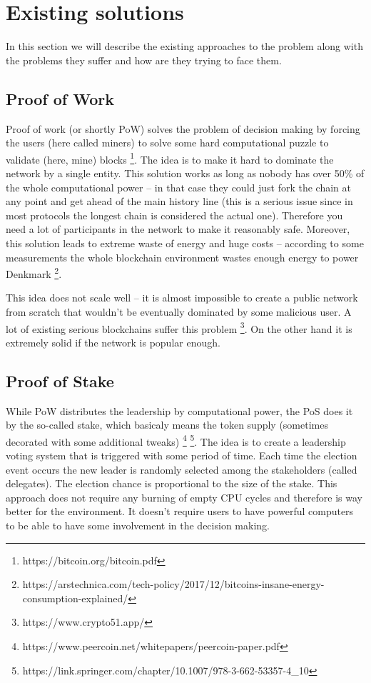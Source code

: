 
\section{Existing solutions}

In this section we will describe the existing approaches to the problem along
with the problems they suffer and how are they trying to face them.

\subsection{Proof of Work}

Proof of work (or shortly PoW) solves the problem of decision making by forcing the
users (here called miners) to solve some hard computational puzzle to validate
(here, mine) blocks \footnote{https://bitcoin.org/bitcoin.pdf}.
The idea is to make it hard to dominate the network by a
single entity. This solution works as long as nobody has over 50\% of the whole
computational power – in that case they could just fork the chain at any point
and get ahead of the main history line (this is a serious issue since in most
protocols the longest chain is considered the actual one). Therefore you need a
lot of participants in the network to make it reasonably safe. Moreover, this
solution leads to extreme waste of energy and huge costs – according to some
measurements the whole blockchain environment wastes enough energy to power
Denkmark
\footnote{https://arstechnica.com/tech-policy/2017/12/bitcoins-insane-energy-consumption-explained/}.

This idea does not scale well – it is almost impossible to create a public
network from scratch that wouldn't be eventually dominated by some malicious
user. A lot of existing serious blockchains suffer this problem
\footnote{https://www.crypto51.app/}. On the other hand it is extremely solid if
the network is popular enough.

\subsection{Proof of Stake}

While PoW distributes the leadership by computational power, the PoS does it by
the so-called stake, which basicaly means the token supply (sometimes decorated
with some additional tweaks)
\footnote{https://www.peercoin.net/whitepapers/peercoin-paper.pdf}
\footnote{https://link.springer.com/chapter/10.1007/978-3-662-53357-4_10}.
The idea is to create a leadership voting system
that is triggered with some period of time. Each time the election event occurs
the new leader is randomly selected among the stakeholders (called delegates).
The election chance is proportional to the size of the stake. This approach does
not require any burning of empty CPU cycles and therefore is way better for the
environment. It doesn't require users to have powerful computers to be able to
have some involvement in the decision making.

